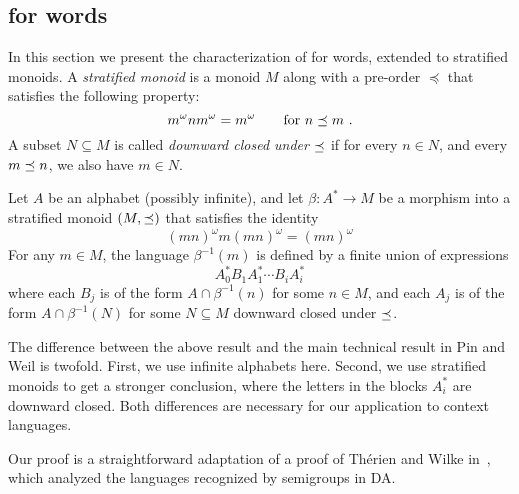 \documentclass{LMCS}
\begin{document}
\subsection{\texorpdfstring{\Dtwo}{Dtwol} for words}
\label{sec:inter-words}
In this section we present the characterization of \Dtwo for words,
extended to stratified monoids.  A \emph{stratified monoid} is a
monoid $M$ along with a pre-order $\preceq$ that satisfies the following
property:
\[
  m^\omega n m^\omega = m^\omega \qquad \mbox{for }n \preceq m\ .
\]
A subset $N \subseteq M$ is called \emph{downward closed under $\preceq$} if for every $n \in N$, and every $m \preceq n$, we also have $m \in N$.
 
\begin{prop}\label{prop:word-da}
  Let $A$ be an alphabet (possibly infinite), and let $\beta : A^* \to
  M$ be a morphism into a stratified monoid $(M, \preceq)$ that satisfies
  the identity
  \begin{equation}
    \label{eq:da}
        (mn)^\omega m (mn)^\omega = (mn)^\omega
  \end{equation}
  For any $m \in M$, the language $\beta^{-1}(m)$ is defined by a
  finite union of expressions
  \[
    A_0^* B_1 A_1^* \cdots B_{i}A_i^*
  \]
  where each $B_j$ is of the form $A \cap \beta^{-1}(n)$ for some $n
  \in M$, and each $A_j$ is of the form $A \cap \beta^{-1}(N)$ for
  some $N \subseteq M$ downward closed under $\preceq$.
\end{prop}

The difference between the above result and the main technical result
in Pin and Weil is twofold. First, we use infinite alphabets here.
Second, we use stratified monoids to get a
stronger conclusion, where the letters in the blocks $A_i^*$ are
downward closed.  Both differences are necessary for our application
to context languages.

Our proof is a straightforward adaptation of a proof of Th\'erien and Wilke
in~\cite{therienwilkefo2}, which analyzed the languages recognized by
semigroups in DA. 
\end{document}
